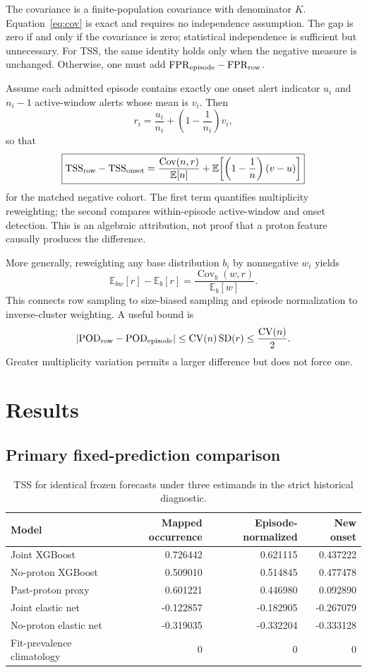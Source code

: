 \documentclass[11pt]{article}
\newcommand{\TSS}{\mathrm{TSS}}
\newcommand{\POD}{\mathrm{POD}}
\newcommand{\FPR}{\mathrm{FPR}}
\newcommand{\E}{\mathbb{E}}
\newcommand{\Cov}{\operatorname{Cov}}
\begin{document}
The covariance is a finite-population covariance with denominator $K$. Equation~\ref{eq:cov} is exact and requires no independence assumption. The gap is zero if and only if the covariance is zero; statistical independence is sufficient but unnecessary. For TSS, the same identity holds only when the negative measure is unchanged. Otherwise, one must add $\FPR_{\rm episode}-\FPR_{\rm row}$.

Assume each admitted episode contains exactly one onset alert indicator $u_i$ and $n_i-1$ active-window alerts whose mean is $v_i$. Then
\[
r_i=\frac{u_i}{n_i}+\left(1-\frac{1}{n_i}\right)v_i,
\]
so that
\begin{equation}
\boxed{
\TSS_{\rm row}-\TSS_{\rm onset}
=\frac{\Cov(n,r)}{\E[n]}
+\E\!\left[\left(1-\frac{1}{n}\right)(v-u)\right]
}
\label{eq:persistence}
\end{equation}
for the matched negative cohort. The first term quantifies multiplicity reweighting; the second compares within-episode active-window and onset detection. This is an algebraic attribution, not proof that a proton feature causally produces the difference.

More generally, reweighting any base distribution $b_i$ by nonnegative $w_i$ yields
\[
\E_{bw}[r]-\E_b[r]=\frac{\Cov_b(w,r)}{\E_b[w]}.
\]
This connects row sampling to size-biased sampling and episode normalization to inverse-cluster weighting. A useful bound is
\[
|\POD_{\rm row}-\POD_{\rm episode}|
\leq \mathrm{CV}(n)\,\mathrm{SD}(r)\leq \frac{\mathrm{CV}(n)}{2}.
\]
Greater multiplicity variation permits a larger difference but does not force one.

\section{Results}

\subsection{Primary fixed-prediction comparison}

\begin{table}[H]
\centering
\caption{TSS for identical frozen forecasts under three estimands in the strict historical diagnostic.}
\label{tab:tss}
\begin{tabular}{lrrr}
\toprule
Model & Mapped occurrence & Episode-normalized & New onset\\
\midrule
Joint XGBoost & 0.726442 & 0.621115 & 0.437222\\
No-proton XGBoost & 0.509010 & 0.514845 & 0.477478\\
Past-proton proxy & 0.601221 & 0.446980 & 0.092890\\
Joint elastic net & -0.122857 & -0.182905 & -0.267079\\
No-proton elastic net & -0.319035 & -0.332204 & -0.333128\\
Fit-prevalence climatology & 0 & 0 & 0\\
\bottomrule
\end{tabular}
\end{table}
\end{document}
